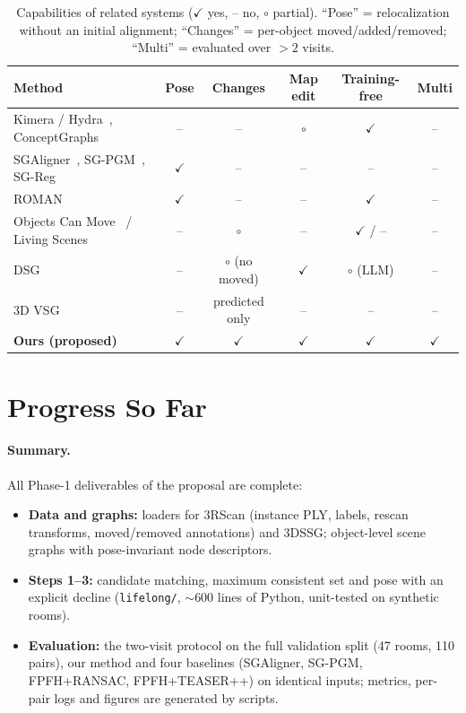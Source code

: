 \documentclass[11pt, a4paper]{article}
\begin{document}
\begin{table}[t]
\centering\small
\caption{Capabilities of related systems ($\checkmark$ yes, -- no, $\circ$ partial). ``Pose'' = relocalization
without an initial alignment; ``Changes'' = per-object moved/added/removed; ``Multi'' = evaluated over $>2$ visits.}
\label{tab:capabilities}
\setlength{\tabcolsep}{4pt}
\begin{tabular}{@{}lccccc@{}}
\toprule
Method & Pose & Changes & Map edit & Training-free & Multi \\
\midrule
Kimera / Hydra~\cite{rosinol2021kimera,hughes2022hydra}, ConceptGraphs~\cite{gu2024conceptgraphs} & -- & -- & $\circ$ & $\checkmark$ & -- \\
SGAligner~\cite{sarkar2023sgaligner}, SG-PGM~\cite{xie2024sgpgm}, SG-Reg~\cite{liu2025sgreg} & $\checkmark$ & -- & -- & -- & -- \\
ROMAN~\cite{peterson2025roman} & $\checkmark$ & -- & -- & $\checkmark$ & -- \\
Objects Can Move~\cite{adam2022objects} / Living Scenes~\cite{zhu2024livingscenes} & -- & $\circ$ & -- & $\checkmark$ / -- & -- \\
DSG~\cite{dsg2026dynamic} & -- & $\circ$ (no moved) & $\checkmark$ & $\circ$ (LLM) & -- \\
3D VSG~\cite{looper2023vsg} & -- & predicted only & -- & -- & -- \\
\textbf{Ours (proposed)} & $\checkmark$ & $\checkmark$ & $\checkmark$ & $\checkmark$ & $\checkmark$ \\
\bottomrule
\end{tabular}
\end{table}

\section{Progress So Far}\label{sec:progress}

\paragraph{Summary.} All Phase-1 deliverables of the proposal are complete:
\begin{itemize}[leftmargin=*, nosep, topsep=1pt]
  \item \textbf{Data and graphs:} loaders for 3RScan (instance PLY, labels, rescan transforms, moved/removed
        annotations) and 3DSSG; object-level scene graphs with pose-invariant node descriptors.
  \item \textbf{Steps 1--3:} candidate matching, maximum consistent set and pose with an explicit decline
        (\texttt{lifelong/}, $\sim$600 lines of Python, unit-tested on synthetic rooms).
  \item \textbf{Evaluation:} the two-visit protocol on the full validation split (47 rooms, 110 pairs), our method and
        four baselines (SGAligner, SG-PGM, FPFH+RANSAC, FPFH+TEASER++) on identical inputs; metrics, per-pair logs and
        figures are generated by scripts.
\end{itemize}
\end{document}

